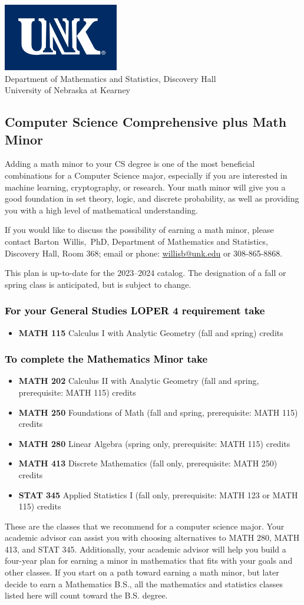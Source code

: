 \documentclass[11pt]{article}
\makeatletter
\newcommand{\calcone}{\textbf{MATH 115} Calculus I with Analytic Geometry (fall and spring) \dotfill 5 credits}
\newcommand{\calctwo}{\textbf{MATH 202} Calculus II with Analytic Geometry (fall and spring, prerequisite: MATH 115) \dotfill 5 credits }
\newcommand{\foundations}{\textbf{MATH 250} Foundations of Math (fall and spring, prerequisite: MATH 115)  \dotfill 3 credits}
\newcommand{\linear}{\textbf{MATH 280} Linear Algebra (spring only, prerequisite: MATH 115) \dotfill 3 credits}
\newcommand{\linearshort}{MATH 280}
\newcommand{\discrete}{\textbf{MATH 413} Discrete Mathematics  (fall only, prerequisite: MATH 250)\dotfill 3 credits}
\newcommand{\discreteshort}{MATH 413}
\newcommand{\appliedstat}{\textbf{STAT 345} Applied Statistics I (fall only, prerequisite: MATH 123 or MATH 115) \dotfill 3 credits}
\newcommand{\appliedstatshort}{STAT 345}
\newcommand{\contactbw}{\mbox{Barton Willis, PhD}, Department of Mathematics and Statistics,  Discovery Hall, Room 368;
email or phone: \href{mailto:willisb@unk.edu}{willisb@unk.edu} or 308-865-8868.}
\newcommand{\forinfo}[2]{If you would like to discuss the possibility of earning a math {#1}, please contact \contactbw}
\newcommand{\catalog}{2023--2024 }
\newcommand{\LOPER}{LOPER\xspace}
\newcommand{\uptodate}{This plan is up-to-date for  the \catalog catalog. The designation of a fall or spring class is 
anticipated, but  is subject to change.}
\newcommand{\myheading}{
\begin{flushleft}
\includegraphics[scale=0.35]{unk-logo}\\
\setcounter{footnote}{0}
\vspace{0.25in}
 \textcolor{unkblue}{Department of Mathematics and Statistics, Discovery Hall} \\
  \textcolor{unkblue}{University of Nebraska at Kearney}
\end{flushleft}}
\makeatother
\begin{document}
\myheading


\subsection*{\textbf{\textcolor{unkblue}{Computer Science Comprehensive plus Math Minor}}}

Adding a math minor to your CS degree is one of the most beneficial 
combinations for a Computer Science major, especially if you are interested 
in machine learning, cryptography, or research. Your math minor will 
give you a good foundation in set theory, logic, and discrete probability, as 
well as providing you with a high level of mathematical understanding.


\forinfo{minor}{Computer Science Comprehensive degree}

\uptodate

\vspace{-0.1in}

\subsubsection*{\textcolor{black}{For your General Studies \LOPER 4 requirement take}}
\begin{itemize}
\item  \calcone
\end{itemize}

\subsubsection*{\textcolor{black}{To complete the Mathematics Minor take}}
\begin{itemize}
\item \calctwo
\item \foundations
\item \linear
\item \discrete
\item \appliedstat
\end{itemize}
\vspace{0.1in}
These are the classes that we recommend for a computer science major.
Your academic advisor can assist you with choosing alternatives 
to \linearshort, \discreteshort, and \appliedstatshort. Additionally,
your academic advisor will help you build a 
four-year plan for earning a minor in mathematics that fits with 
your goals and other classes.  If you start on a path toward earning a math minor, but later decide to 
earn a Mathematics B.S., all the mathematics and statistics  classes listed here 
will count toward the B.S. degree.
\end{document}
